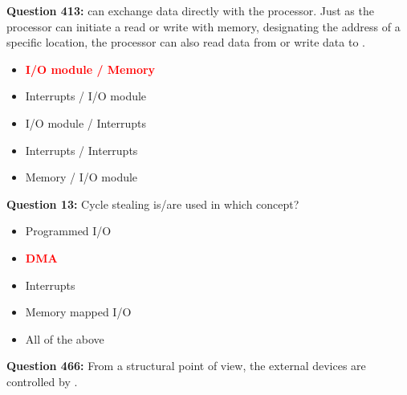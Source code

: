 \documentclass[12pt,a4paper]{article}
\begin{document}
\vspace{0.5cm}

\vspace{0.5cm}

\textbf{Question 413:} \underline{\hspace{1.5cm}} can exchange data directly with the processor. Just as the processor can initiate a read or write with memory, designating the address of a specific location, the processor can also read data from or write data to \underline{\hspace{1.5cm}}.

\begin{itemize}
    \item[\textbf{A.}] \textcolor{red}{\textbf{I/O module / Memory}}
    \item[\textbf{B.}] Interrupts / I/O module
    \item[\textbf{C.}] I/O module / Interrupts
    \item[\textbf{D.}] Interrupts / Interrupts
    \item[\textbf{E.}] Memory / I/O module
\end{itemize}

\vspace{0.5cm}

\vspace{0.5cm}

\textbf{Question 13:} Cycle stealing is/are used in which concept?

\begin{itemize}
    \item[\textbf{A.}] Programmed I/O
    \item[\textbf{B.}] \textcolor{red}{\textbf{DMA}}
    \item[\textbf{C.}] Interrupts
    \item[\textbf{D.}] Memory mapped I/O
    \item[\textbf{E.}] All of the above
\end{itemize}

\vspace{0.5cm}

\vspace{0.5cm}

\vspace{0.5cm}

\vspace{0.5cm}

\textbf{Question 466:} From a structural point of view, the external devices are controlled by \underline{\hspace{1.5cm}}.
\end{document}
